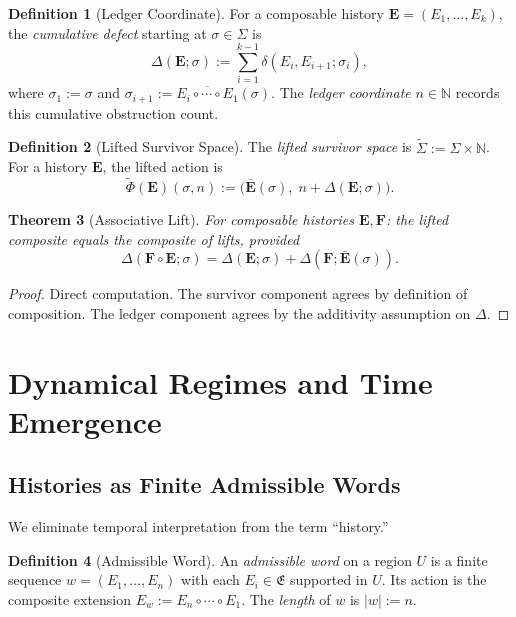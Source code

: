\documentclass[11pt,a4paper]{article}
\newtheorem{theorem}{Theorem}[section]
\theoremstyle{definition}
\newtheorem{definition}[theorem]{Definition}
\theoremstyle{remark}
\begin{document}
\begin{definition}[Ledger Coordinate]\label{def:ledger}
For a composable history $\mathbf{E} = (E_1, \dots, E_k)$, the \emph{cumulative defect} starting at $\sigma \in \Sigma$ is
\[
  \Delta(\mathbf{E}; \sigma) := \sum_{i=1}^{k-1} \delta(E_i, E_{i+1}; \sigma_i),
\]
where $\sigma_1 := \sigma$ and $\sigma_{i+1} := \overline{E_i \circ \cdots \circ E_1}(\sigma)$. The \emph{ledger coordinate} $n \in \mathbb{N}$ records this cumulative obstruction count.
\end{definition}

\begin{definition}[Lifted Survivor Space]\label{def:lifted}
The \emph{lifted survivor space} is $\widetilde{\Sigma} := \Sigma \times \mathbb{N}$. For a history $\mathbf{E}$, the lifted action is
\[
  \widetilde{\Phi}(\mathbf{E})(\sigma, n) := \bigl(\bar{\mathbf{E}}(\sigma),\; n + \Delta(\mathbf{E}; \sigma)\bigr).
\]
\end{definition}

\begin{theorem}[Associative Lift]\label{thm:lift}
For composable histories $\mathbf{E}, \mathbf{F}$: the lifted composite equals the composite of lifts, provided
\[
  \Delta(\mathbf{F} \circ \mathbf{E}; \sigma) = \Delta(\mathbf{E}; \sigma) + \Delta(\mathbf{F}; \bar{\mathbf{E}}(\sigma)).
\]
\end{theorem}
\begin{proof}
Direct computation. The survivor component agrees by definition of composition. The ledger component agrees by the additivity assumption on $\Delta$.
\end{proof}

\section{Dynamical Regimes and Time Emergence}

\subsection{Histories as Finite Admissible Words}

We eliminate temporal interpretation from the term ``history.''

\begin{definition}[Admissible Word]\label{def:word}
An \emph{admissible word} on a region $U$ is a finite sequence $w = (E_1, \dots, E_n)$ with each $E_i \in \mathfrak{E}$ supported in $U$. Its action is the composite extension $E_w := E_n \circ \cdots \circ E_1$. The \emph{length} of $w$ is $|w| := n$.
\end{definition}
\end{document}
